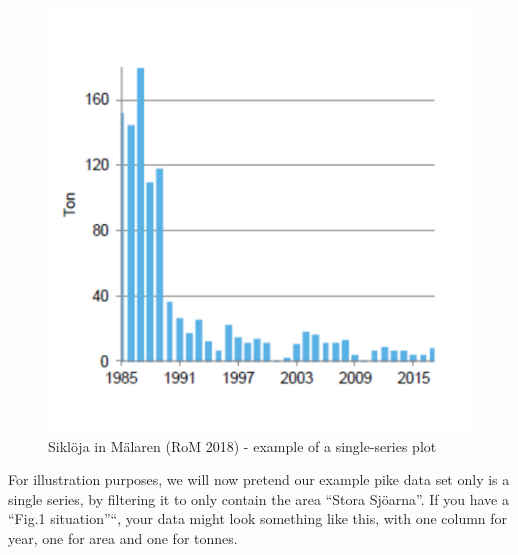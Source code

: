 \documentclass[]{article}
\newenvironment{Shaded}{\begin{snugshade}}{\end{snugshade}}
\newcommand{\KeywordTok}[1]{\textcolor[rgb]{0.13,0.29,0.53}{\textbf{#1}}}
\newcommand{\StringTok}[1]{\textcolor[rgb]{0.31,0.60,0.02}{#1}}
\newcommand{\OperatorTok}[1]{\textcolor[rgb]{0.81,0.36,0.00}{\textbf{#1}}}
\newcommand{\NormalTok}[1]{#1}
\begin{document}
\begin{figure}

{\centering \includegraphics{sikloja} 

}

\caption{Siklöja in Mälaren (RoM 2018) - example of a single-series plot}\label{fig:plot sikloja}
\end{figure}

For illustration purposes, we will now pretend our example pike data set
only is a single series, by filtering it to only contain the area
``Stora Sjöarna''. If you have a ``Fig.1 situation''``, your data might
look something like this, with one column for year, one for area and one
for tonnes.

\begin{Shaded}
\end{Shaded}
\end{document}

